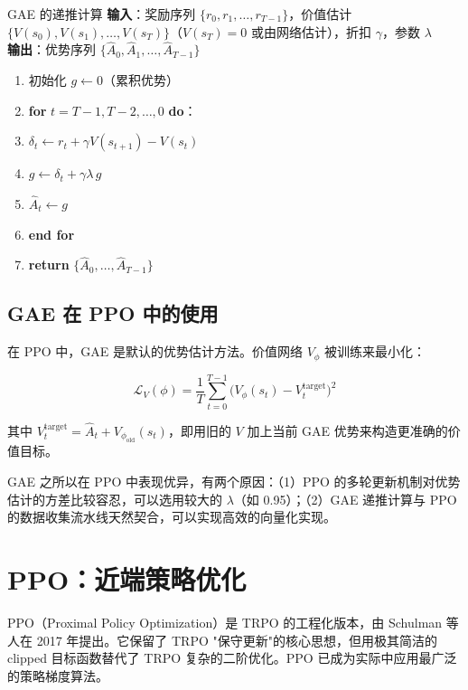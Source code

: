 \begin{myalgorithm}{GAE 的递推计算}
\textbf{输入}：奖励序列 $\{r_0, r_1, \dots, r_{T-1}\}$，价值估计 $\{V(s_0), V(s_1), \dots, V(s_T)\}$（$V(s_T)=0$ 或由网络估计），折扣 $\gamma$，参数 $\lambda$\\
\textbf{输出}：优势序列 $\{\hat{A}_0, \hat{A}_1, \dots, \hat{A}_{T-1}\}$
\begin{enumerate}
    \item 初始化 $g \leftarrow 0$（累积优势）
    \item \textbf{for} $t = T-1, T-2, \dots, 0$ \textbf{do}：
    \item \quad $\delta_t \leftarrow r_t + \gamma V(s_{t+1}) - V(s_t)$
    \item \quad $g \leftarrow \delta_t + \gamma \lambda \, g$
    \item \quad $\hat{A}_t \leftarrow g$
    \item \textbf{end for}
    \item \textbf{return} $\{\hat{A}_0, \dots, \hat{A}_{T-1}\}$
\end{enumerate}
\end{myalgorithm}

\subsection{GAE 在 PPO 中的使用}

在 PPO 中，GAE 是默认的优势估计方法。价值网络 $V_\phi$ 被训练来最小化：

\[
\mathcal{L}_V(\phi) = \frac{1}{T} \sum_{t=0}^{T-1} \big( V_\phi(s_t) - V_t^{\text{target}} \big)^2
\]

其中 $V_t^{\text{target}} = \hat{A}_t + V_{\phi_{\text{old}}}(s_t)$，即用旧的 $V$ 加上当前 GAE 优势来构造更准确的价值目标。

\begin{remark}
GAE 之所以在 PPO 中表现优异，有两个原因：（1）PPO 的多轮更新机制对优势估计的方差比较容忍，可以选用较大的 $\lambda$（如 0.95）；（2）GAE 递推计算与 PPO 的数据收集流水线天然契合，可以实现高效的向量化实现。
\end{remark}

\section{PPO：近端策略优化}

PPO（Proximal Policy Optimization）是 TRPO 的工程化版本，由 Schulman 等人在 2017 年提出。它保留了 TRPO "保守更新"的核心思想，但用极其简洁的 clipped 目标函数替代了 TRPO 复杂的二阶优化。PPO 已成为实际中应用最广泛的策略梯度算法。

